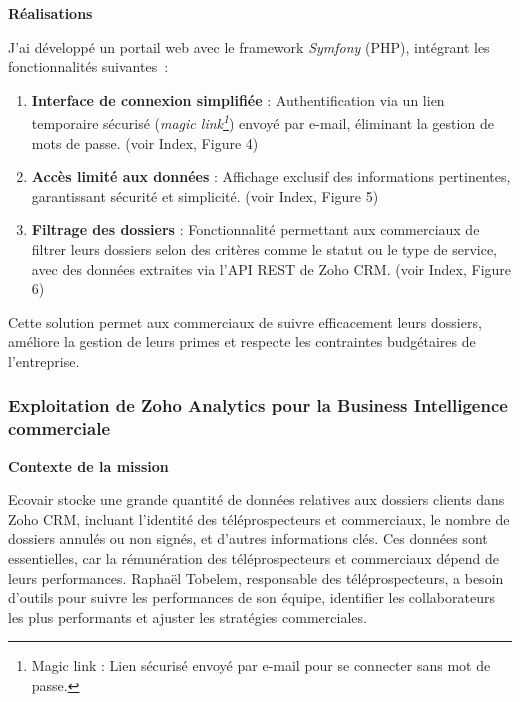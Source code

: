 \textbf{Réalisations}\vspace{0.3cm}

J’ai développé un portail web avec le framework \textit{Symfony} (PHP), intégrant les fonctionnalités suivantes~:\vspace{0.3cm}

\begin{enumerate}
    \item \textbf{Interface de connexion simplifiée} : Authentification via un lien temporaire sécurisé (\textit{magic link\footnote{Magic link : Lien sécurisé envoyé par e-mail pour se connecter sans mot de passe.}}) envoyé par e-mail, éliminant la gestion de mots de passe. (voir Index, Figure 4)\vspace{0.3cm}
    \item \textbf{Accès limité aux données} : Affichage exclusif des informations pertinentes, garantissant sécurité et simplicité. (voir Index, Figure 5)\vspace{0.3cm}
    \item \textbf{Filtrage des dossiers} : Fonctionnalité permettant aux commerciaux de filtrer leurs dossiers selon des critères comme le statut ou le type de service, avec des données extraites via l’API REST de Zoho CRM. (voir Index, Figure 6)\vspace{0.3cm}
\end{enumerate}

Cette solution permet aux commerciaux de suivre efficacement leurs dossiers, améliore la gestion de leurs primes et respecte les contraintes budgétaires de l’entreprise.


\subsubsection{Exploitation de Zoho Analytics pour la Business Intelligence commerciale}

\textbf{Contexte de la mission}\vspace{0.3cm}

Ecovair stocke une grande quantité de données relatives aux dossiers clients dans Zoho CRM, incluant l’identité des téléprospecteurs et commerciaux, le nombre de dossiers annulés ou non signés, et d’autres informations clés. Ces données sont essentielles, car la rémunération des téléprospecteurs et commerciaux dépend de leurs performances. Raphaël Tobelem, responsable des téléprospecteurs, a besoin d’outils pour suivre les performances de son équipe, identifier les collaborateurs les plus performants et ajuster les stratégies commerciales.

